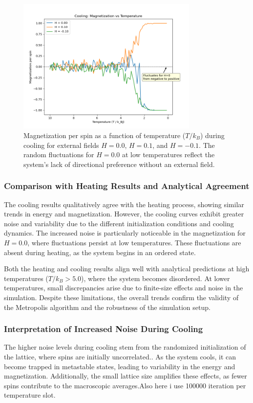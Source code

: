 \documentclass[11pt]{article}
\begin{document}
\begin{figure}[h!]
\centering
\includegraphics[width=0.8\textwidth]{Figs_Salar/cooling M-T (S).png}
\caption{Magnetization per spin as a function of temperature (\(T / k_B\)) during cooling for external fields \(H = 0.0\), \(H = 0.1\), and \(H = -0.1\). The random fluctuations for \(H = 0.0\) at low temperatures reflect the system's lack of directional preference without an external field.}
\label{fig:cooling_M-T}
\end{figure}

\subsubsection*{Comparison with Heating Results and Analytical Agreement}
The cooling results qualitatively agree with the heating process, showing similar trends in energy and magnetization. However, the cooling curves exhibit greater noise and variability due to the different initialization conditions and cooling dynamics. The increased noise is particularly noticeable in the magnetization for \(H = 0.0\), where fluctuations persist at low temperatures. These fluctuations are absent during heating, as the system begins in an ordered state.

Both the heating and cooling results align well with analytical predictions at high temperatures (\(T / k_B > 5.0\)), where the system becomes disordered. At lower temperatures, small discrepancies arise due to finite-size effects and noise in the simulation. Despite these limitations, the overall trends confirm the validity of the Metropolis algorithm and the robustness of the simulation setup.

\subsubsection*{Interpretation of Increased Noise During Cooling}
The higher noise levels during cooling stem from the randomized initialization of the lattice, where spins are initially uncorrelated.. As the system cools, it can become trapped in metastable states, leading to variability in the energy and magnetization. Additionally, the small lattice size amplifies these effects, as fewer spins contribute to the macroscopic averages.Also here i use 100000 iteration per temperature slot.
\end{document}
